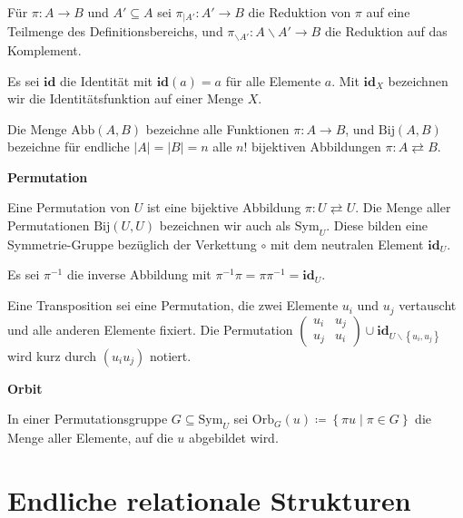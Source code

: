 \begin{defn}
Für $\pi:A\rightarrow B$ und $A'\subseteq A$ sei $\pi_{\mid A'}:A'\rightarrow B$
die Reduktion von $\pi$ auf eine Teilmenge des Definitionsbereichs,
und $\pi_{\backslash A'}:A\backslash A'\rightarrow B$ die Reduktion
auf das Komplement.

Es sei $\mathbf{id}$ die Identität mit $\mathbf{id}\left(a\right)=a$
für alle Elemente $a$. Mit $\mathbf{id}_{X}$ bezeichnen wir die
Identitätsfunktion auf einer Menge $X$.

Die Menge $\mathrm{Abb}\left(A,B\right)$ bezeichne alle Funktionen
$\pi:A\rightarrow B$, und $\mathrm{Bij}\left(A,B\right)$ bezeichne
für endliche $\left|A\right|=\left|B\right|=n$ alle $n!$ bijektiven
Abbildungen $\pi:A\rightleftarrows B$.
\end{defn}
%
\begin{defn}
\textbf{Permutation}

Eine Permutation von $U$ ist eine bijektive Abbildung $\pi:U\rightleftarrows U$.
Die Menge aller Permutationen $\mathrm{Bij}\left(U,U\right)$ bezeichnen
wir auch als $\mathrm{Sym}_{U}$. Diese bilden eine Symmetrie-Gruppe
bezüglich der Verkettung $\circ$ mit dem neutralen Element $\mathbf{id}_{U}$.

Es sei $\pi^{-1}$ die inverse Abbildung mit $\pi^{-1}\pi=\pi\pi^{-1}=\mathbf{id}_{U}$.

Eine Transposition sei eine Permutation, die zwei Elemente $u_{i}$
und $u_{j}$ vertauscht und alle anderen Elemente fixiert. Die Permutation
$\left(\begin{array}{cc}
u_{i} & u_{j}\\
u_{j} & u_{i}
\end{array}\right)\cup\mathbf{id}_{U\backslash\left\{ u_{i},u_{j}\right\} }$ wird kurz durch $\left(u_{i}u_{j}\right)$ notiert.
\end{defn}
%
\begin{defn}
\textbf{\label{def:orbit}Orbit}

In einer Permutationsgruppe $G\subseteq\mathrm{Sym}_{U}$ sei $\mathrm{Orb}_{G}\left(u\right)\coloneqq\left\{ \pi u\mid\pi\in G\right\} $
die Menge aller Elemente, auf die $u$ abgebildet wird.
\end{defn}

\section{Endliche relationale Strukturen}

